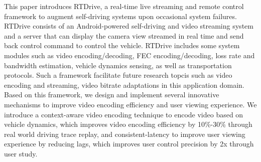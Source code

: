
This paper introduces RTDrive, a real-time live streaming and 
remote control framework to augment self-driving
systems upon occasional system failures. 
RTDrive consists of an Android-powered self-driving
and video streaming system and a server that can
display the camera view streamed in real time 
and send back control command to control the
vehicle. 
RTDrive includes some system modules 
such as video encoding/decoding, FEC encoding/decoding,
loss rate and bandwidth estimation, vehicle dynamics
sensing, as well as transportation protocols. 
Such a framework facilitate future research topcis such as
video encoding and streaming, video bitrate adaptations
in this application domain. 
Based on this framework, 
we design and implement several innovative mechanisms to improve
video encoding efficiency and user viewing experience.
We introduce a context-aware video encoding technique
to encode video based on vehicle dynamics, 
which improves video encoding efficiency by 10\%-30\%
through real world driving trace replay,
and consistent-latency to improve user viewing experience
by reducing lags, which improves user control
precision by 2x through user study. 
 

